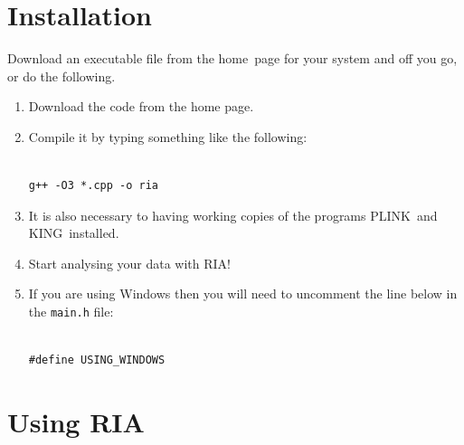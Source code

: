 \documentclass[a4paper,12pt]{article}
\newcommand{\code}[1]{{\footnotesize{{\tt #1}}}}
\begin{document}

\section{Installation}
\label{installation}

Download an executable file from the home~page for your system and off you go, or do the following. 
\begin{enumerate}

\item Download the code from the home page. 
\item Compile it by typing something like the following: \vspace{0.35cm} \begin{lstlisting}

g++ -O3 *.cpp -o ria

\end{lstlisting} \vspace{0.35cm}
\item It is also necessary to having working copies of the programs PLINK~and KING~installed. 
\item Start analysing your data with RIA! 
\item If you are using Windows then you will need to uncomment the line below in the \code{main.h} file: \vspace{0.35cm} \begin{lstlisting}

#define USING_WINDOWS

\end{lstlisting} \vspace{0.35cm}\end{enumerate}


\section{Using RIA}
\label{using}
\end{document}
